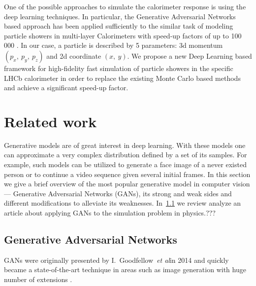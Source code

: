 \documentclass{webofc}
\makeatletter
\newcommand{\onedot}{\futurelet\@let@token\@onedot}
\newcommand{\etal}{\emph{et al}\onedot}
\makeatother
\begin{document}
    
One of the possible approaches to simulate the calorimeter response is using the deep learning techniques. In particular, the Generative Adversarial Networks based approach has been applied sufficiently to the similar task of modeling particle showers in multi-layer Calorimeters with speed-up factors of up to 100 000 \cite{paganini2017calogan}. In our case, a particle is described by 5 parameters: 3d momentum $(p_x,~ p_y,~ p_z)$ and 2d coordinate $(x,~ y)$. We propose a new Deep Learning based framework for high-fidelity fast simulation of particle showers in the specific LHCb calorimeter in order to replace the existing Monte Carlo based methods and achieve a significant speed-up factor.

\section{Related work}
Generative models are of great interest in deep learning. With these models one can approximate a very complex distribution defined by a set of its samples. 
For example, such models can be utilized to generate a face image of a never existed person or to continue a video sequence given several initial frames. 
In this section we give a brief overview of the most popular generative model in computer vision — Generative Adversarial Networks (GANs),
 its strong and weak sides and different modifications to alleviate its weaknesses. In~\cref{} we review analyze an article about applying GANs to the simulation problem in physics.???

\subsection{Generative Adversarial Networks}
GANs were originally presented by I.~Goodfellow~\etal in 2014 \cite{goodfellow2014generative} and quickly became a state-of-the-art technique in areas such as image generation \cite{radford2015unsupervised} with huge number of extensions \cite{1,2,3,4}.
\end{document}

